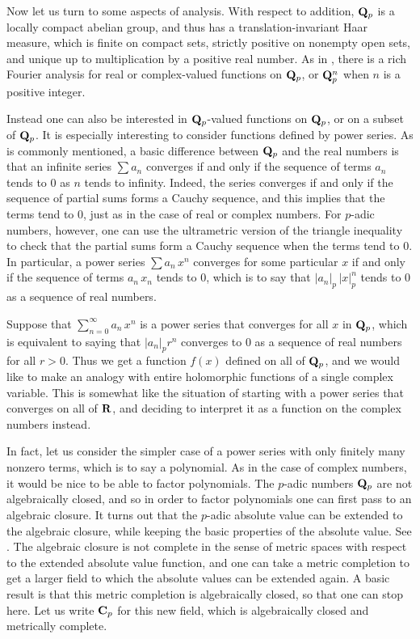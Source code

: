 \documentclass[12pt,leqno,draft]{article}
\begin{document}
	Now let us turn to some aspects of analysis.  With respect to
addition, ${\bf Q}_p$ is a locally compact abelian group, and thus has
a translation-invariant Haar measure, which is finite on compact sets,
strictly positive on nonempty open sets, and unique up to
multiplication by a positive real number.  As in \cite{Taibleson},
there is a rich Fourier analysis for real or complex-valued functions
on ${\bf Q}_p$, or ${\bf Q}_p^n$ when $n$ is a positive integer.

	Instead one can also be interested in ${\bf Q}_p$-valued
functions on ${\bf Q}_p$, or on a subset of ${\bf Q}_p$.  It is
especially interesting to consider functions defined by power series.
As is commonly mentioned, a basic difference between ${\bf Q}_p$ and
the real numbers is that an infinite series $\sum a_n$ converges if
and only if the sequence of terms $a_n$ tends to $0$ as $n$ tends to
infinity.  Indeed, the series converges if and only if the sequence of
partial sums forms a Cauchy sequence, and this implies that the terms
tend to $0$, just as in the case of real or complex numbers.  For
$p$-adic numbers, however, one can use the ultrametric version of the
triangle inequality to check that the partial sums form a Cauchy
sequence when the terms tend to $0$.  In particular, a power series
$\sum a_n \, x^n$ converges for some particular $x$ if and only if the
sequence of terms $a_n \, x_n$ tends to $0$, which is to say that
$|a_n|_p \, |x|_p^n$ tends to $0$ as a sequence of real numbers.

	Suppose that $\sum_{n = 0}^\infty a_n \, x^n$ is a power
series that converges for all $x$ in ${\bf Q}_p$, which is equivalent
to saying that $|a_n|_p r^n$ converges to $0$ as a sequence of real
numbers for all $r > 0$.  Thus we get a function $f(x)$ defined
on all of ${\bf Q}_p$, and we would like to make an analogy with
entire holomorphic functions of a single complex variable.  This
is somewhat like the situation of starting with a power series that
converges on all of ${\bf R}$, and deciding to interpret it as a 
function on the complex numbers instead.

	In fact, let us consider the simpler case of a power series
with only finitely many nonzero terms, which is to say a polynomial.
As in the case of complex numbers, it would be nice to be able to
factor polynomials.  The $p$-adic numbers ${\bf Q}_p$ are not
algebraically closed, and so in order to factor polynomials one 
can first pass to an algebraic closure.  It turns out that the $p$-adic
absolute value can be extended to the algebraic closure, while keeping
the basic properties of the absolute value.  See \cite{Cassels, Gouvea}.
The algebraic closure is not complete in the sense of metric spaces
with respect to the extended absolute value function, and one can
take a metric completion to get a larger field to which the absolute
values can be extended again.  A basic result is that this metric
completion is algebraically closed, so that one can stop here.
Let us write ${\bf C}_p$ for this new field, which is algebraically
closed and metrically complete.
\end{document}
